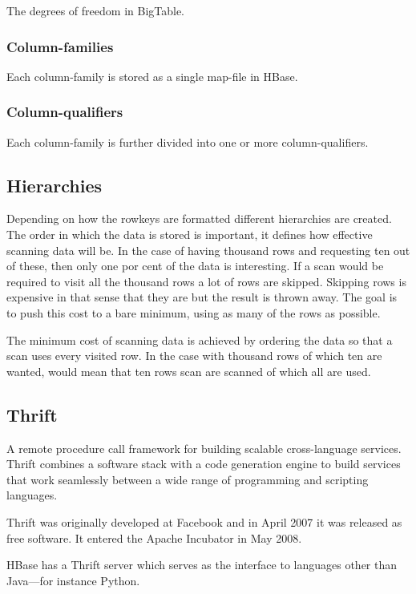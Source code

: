 \documentclass[a4paper,10pt]{book}
\begin{document}
The degrees of freedom in BigTable.

\subsubsection*{Column-families}

Each column-family is stored as a single map-file in HBase.


\subsubsection*{Column-qualifiers}

Each column-family is further divided into one or more column-qualifiers.


\subsection*{Hierarchies}

Depending on how the rowkeys are formatted different hierarchies are
created. The order in which the data is stored is important, it defines how
effective scanning data will be. In the case of having thousand rows and
requesting ten out of these, then only one por cent of the data is
interesting. If a scan would be required to visit all the thousand rows a
lot of rows are skipped. Skipping rows is expensive in that sense that they
are but the result is thrown away. The goal is to push this cost to a bare
minimum, using as many of the rows as possible.

The minimum cost of scanning data is achieved by ordering the data so that
a scan uses every visited row. In the case with thousand rows of which ten
are wanted, would mean that ten rows scan are scanned of which all are
used.
\subsection{Thrift}

A remote procedure call framework for building scalable cross-language
services. Thrift combines a software stack with a code generation engine to
build services that work seamlessly between a wide range of programming and
scripting languages. \cite{thrift}

Thrift was originally developed at Facebook and in April 2007 it was
released as free software. It entered the Apache Incubator in May 2008.

HBase has a Thrift server which serves as the interface to languages other
than Java---for instance Python.
\end{document}
